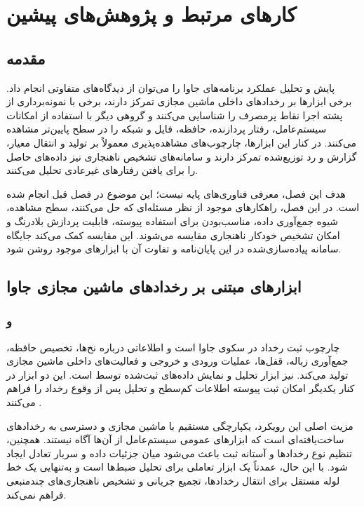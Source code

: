 \chapter{کارهای مرتبط و پژوهش‌های پیشین}
\label{chap:related-work}

\section{مقدمه}
\label{sec:related-work-introduction}

پایش و تحلیل عملکرد برنامه‌های جاوا را می‌توان از دیدگاه‌های متفاوتی
انجام داد. برخی ابزارها بر رخدادهای داخلی ماشین مجازی تمرکز دارند، برخی
با نمونه‌برداری از پشته اجرا نقاط پرمصرف را شناسایی می‌کنند و گروهی دیگر
با استفاده از امکانات سیستم‌عامل، رفتار پردازنده، حافظه، فایل و شبکه را
در سطح پایین‌تر مشاهده می‌کنند. در کنار این ابزارها، چارچوب‌های
مشاهده‌پذیری معمولاً بر تولید و انتقال معیار، گزارش و رد توزیع‌شده تمرکز
دارند و سامانه‌های تشخیص ناهنجاری نیز داده‌های حاصل را برای یافتن رفتارهای
غیرعادی تحلیل می‌کنند.

هدف این فصل، معرفی فناوری‌های پایه نیست؛ این موضوع در فصل قبل انجام شده
است. در این فصل، راهکارهای موجود از نظر مسئله‌ای که حل می‌کنند، سطح
مشاهده، شیوه جمع‌آوری داده، مناسب‌بودن برای استفاده پیوسته، قابلیت پردازش
بلادرنگ و امکان تشخیص خودکار ناهنجاری مقایسه می‌شوند. این مقایسه کمک
می‌کند جایگاه سامانه پیاده‌سازی‌شده در این پایان‌نامه و تفاوت آن با
ابزارهای موجود روشن شود.

\section{ابزارهای مبتنی بر رخدادهای ماشین مجازی جاوا}
\label{sec:related-jvm-event-tools}

\subsection{ و }

 چارچوب ثبت رخداد در سکوی جاوا است و اطلاعاتی
درباره نخ‌ها، تخصیص حافظه، جمع‌آوری زباله، قفل‌ها، عملیات ورودی و خروجی و
فعالیت‌های داخلی ماشین مجازی تولید می‌کند. 
نیز ابزار تحلیل و نمایش داده‌های ثبت‌شده توسط  است. این دو ابزار
در کنار یکدیگر امکان ثبت پیوسته اطلاعات کم‌سطح و تحلیل پس از وقوع رخداد
را فراهم می‌کنند \cite{jfrdocs,jmcdocs,openjdkjmc}.

مزیت اصلی این رویکرد، یکپارچگی مستقیم با ماشین مجازی و دسترسی به رخدادهای
ساخت‌یافته‌ای است که ابزارهای عمومی سیستم‌عامل از آن‌ها آگاه نیستند.
همچنین، تنظیم نوع رخدادها و آستانه ثبت باعث می‌شود میان جزئیات داده و
سربار تعادل ایجاد شود. با این حال،  عمدتاً یک ابزار تعاملی برای
تحلیل ضبط‌ها است و به‌تنهایی یک خط لوله مستقل برای انتقال رخدادها،
تجمیع جریانی و تشخیص ناهنجاری‌های چندمنبعی فراهم نمی‌کند.

